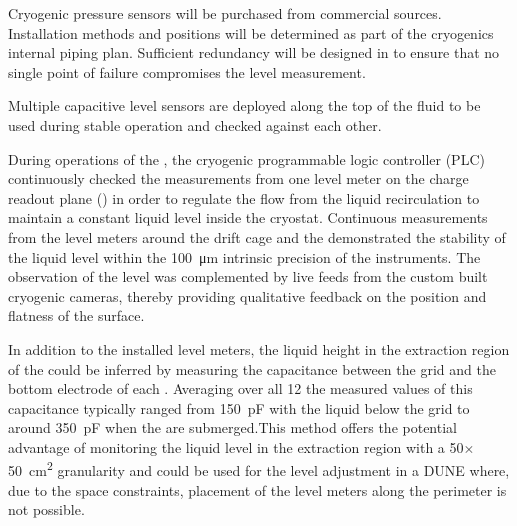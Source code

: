 Cryogenic pressure sensors will be purchased from commercial sources.
Installation methods and positions will be determined as part of the
cryogenics internal piping plan.  Sufficient redundancy will be designed in
to ensure that no single point of failure compromises the level measurement.

Multiple capacitive level sensors are deployed along the top of
the fluid to be used during stable operation and checked against each
other.

During operations of the , the cryogenic programmable logic controller (PLC) continuously checked the measurements from one level meter on the charge readout plane () in order to regulate the flow from the liquid recirculation to maintain a constant liquid level inside the cryostat. Continuous measurements from the level meters around the drift cage and the  demonstrated the stability of the liquid level within the \SI{100}{\micro\meter} intrinsic precision of the instruments. The observation of the level was complemented by live feeds from the custom built cryogenic cameras, thereby providing qualitative feedback on the position and flatness of the surface.

In addition to the installed level meters, the liquid height in the extraction region of the  could be inferred by measuring the capacitance between the grid and the bottom electrode of each . Averaging over all \num{12}  the measured values of this capacitance typically ranged from \SI{150}{pF} with the liquid below the grid to around  \SI{350}{pF}  when the  are submerged.This method offers the potential advantage of monitoring the liquid level in the  extraction region with a \num{50}$\times$\SI{50}{\cm^2} granularity and could be used for the  level adjustment in a DUNE  where, due to the space constraints, placement of the level meters along the  perimeter is not possible.
